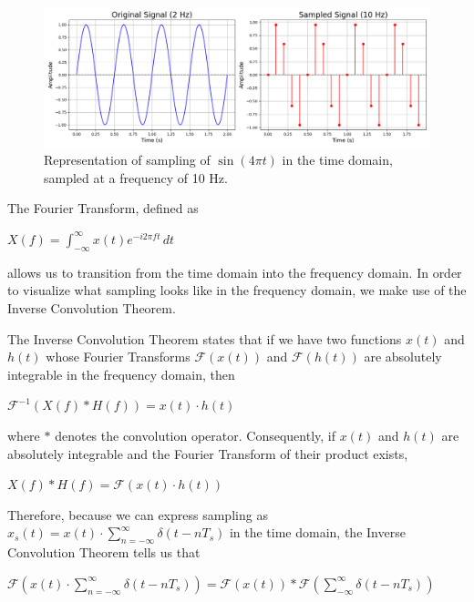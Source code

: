 \documentclass{article}
\begin{document}
\begin{figure}[H]
    \includegraphics[width=\linewidth]{images/leftright_ogsampled.png}
    \caption{Representation of sampling of $\sin(4\pi t)$ in the time domain, sampled at a frequency of 10 Hz.}
    \label{fig:enter-label}
\end{figure}
The Fourier Transform, defined as
\begin{center}
    \begin{math}
       X(f) = \displaystyle \int_{-\infty}^{\infty} x(t)e^{-i2\pi ft}\, dt
    \end{math}
\end{center}
allows us to transition from the time domain into the frequency domain. In order to visualize what sampling looks like in the frequency domain, we make use of the Inverse Convolution Theorem.

The Inverse Convolution Theorem states that if we have two functions $x(t)$ and $h(t)$ whose Fourier Transforms $\mathcal{F}(x(t))$ and $\mathcal{F}(h(t))$ are absolutely integrable in the frequency domain,
then 
\begin{center}
    \begin{math}
        \mathcal{F}^{-1} \left(X(f) * H(f) \right) = x(t) \cdot h(t)
    \end{math}  
\end{center}
where $*$ denotes the convolution operator. 
Consequently, if $x(t)$ and $h(t)$ are absolutely integrable and the Fourier Transform of their product exists,
\begin{center}
    \begin{math}
        X(f) * H(f) = \mathcal{F}\left(x(t) \cdot h(t)\right)
    \end{math}  
\end{center}

Therefore, because we can express sampling as $x_s(t) = x(t) \cdot \displaystyle\sum_{n=-\infty}^{\infty} \delta (t-nT_s)$ in the time domain, the Inverse Convolution Theorem tells us that %
\begin{center}
    \begin{math}
        \mathcal{F}\left(x(t) \cdot \displaystyle\sum_{n=-\infty}^{\infty} \delta (t-nT_s)\right) = \mathcal{F}(x(t)) * \mathcal{F}\left(\displaystyle \sum_{-\infty}^{\infty} \delta (t-nT_s) \right)
    \end{math}  
\end{center}
\end{document}
